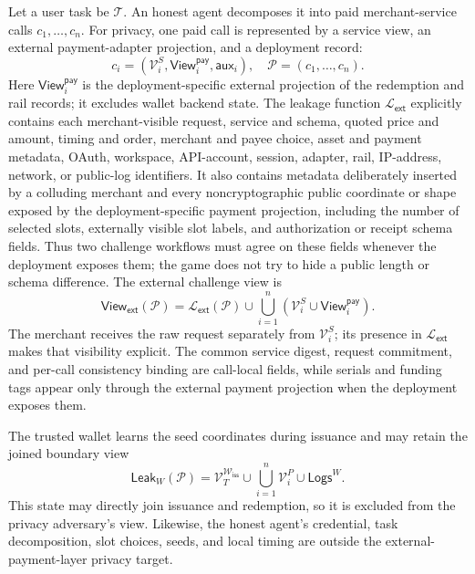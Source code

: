 \documentclass[letterpaper]{article}
\newcommand{\trace}{\mathcal{P}}
\newcommand{\task}{\mathcal{T}}
\begin{document}
Let a user task be $\task$. An honest agent decomposes it into paid
merchant-service calls \(c_1,\ldots,c_n\). For privacy, one paid call is
represented by a service view, an external payment-adapter projection, and a
deployment record:
\begin{equation}
  c_i=(\mathcal V_i^{S},\mathsf{View}_i^{\mathsf{pay}},\mathsf{aux}_i),
  \quad \trace=(c_1,\ldots,c_n).
\end{equation}
Here \(\mathsf{View}_i^{\mathsf{pay}}\) is the deployment-specific external
projection of the redemption and rail records; it excludes wallet backend state.
The leakage function \(\mathcal L_{\mathsf{ext}}\) explicitly contains each
merchant-visible request, service and schema, quoted price and amount, timing
and order, merchant and payee choice, asset and payment metadata, OAuth,
workspace, API-account, session, adapter, rail, IP-address,
network, or public-log identifiers. It also contains metadata deliberately
inserted by a colluding merchant and every noncryptographic public coordinate
or shape exposed by the deployment-specific payment projection, including the
number of selected slots, externally visible slot labels, and authorization or
receipt schema fields. Thus two challenge workflows must agree on these fields
whenever the deployment exposes them; the game does not try to hide a public
length or schema difference. The external challenge view is
\begin{equation}
  \mathsf{View}_{\mathsf{ext}}(\trace)
  =\mathcal L_{\mathsf{ext}}(\trace)
  \cup\bigcup_{i=1}^{n}
  (\mathcal V_i^S\cup\mathsf{View}_i^{\mathsf{pay}}).
\label{eq:external-view}
\end{equation}
The merchant receives the raw request separately from \(\mathcal V_i^S\); its
presence in \(\mathcal L_{\mathsf{ext}}\) makes that visibility explicit. The
common service digest, request commitment, and per-call consistency binding are call-local
fields, while serials and funding tags appear only through the external payment
projection when the deployment exposes them.

The trusted wallet learns the seed coordinates during issuance and may
retain the joined boundary view
\begin{equation}
  \mathsf{Leak}_W(\trace)
  =\mathcal V_T^{\mathcal{W}_{\mathsf{iss}}}
  \cup\bigcup_{i=1}^{n}\mathcal V_i^P\cup\mathsf{Logs}^W.
\end{equation}
This state may directly join issuance and redemption, so it is excluded from
the privacy adversary's view. Likewise, the honest agent's
credential, task decomposition, slot choices, seeds, and local timing are
outside the external-payment-layer privacy target.
\end{document}
